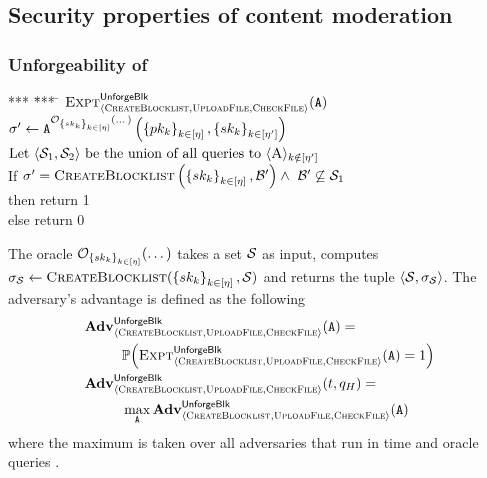 \iffalse 
\subsection{Security properties of content moderation}
\label{sec:defn:content_mod}
\subsubsection{Unforgeability of \blklistToken}
%

		\begin{center}
	\begin{minipage}{0.5\columnwidth}
		\begin{tabbing}
			*** \= *** \= \kill
			$\Experiment{\unforgeBlocklistLabel}{\contentModSchemeDefn}(\adversary)$ \\
			\> $\genericSigAlt \assign \adversary^{\genericOracle_{\setOfAuditorPrivkeys}(\dots)}\left(\setOfAuditorPubkeys, \setOfDishonestAuditorPrivkeys\right)$\\
			\> $\text{Let} ~\langle\genericSetVar[1], \genericSetVar[2]\rangle ~\text{be the union of all queries to} ~\langle \auditor \rangle_{\auditorIdx \notin \nats[\numDishonestAuditors]}$\\
	        \> If $\genericSigAlt =  \createBlocklist\left(\setOfAuditorPrivkeys, \blocklist' \right) 
			\land ~\blocklist' \not \subseteq \genericSetVar[1]$\\
			\> \> then return 1\\
            \> \> else return 0
		\end{tabbing}
	\end{minipage}
	\end{center}	


The oracle $\genericOracle_{\setOfAuditorPrivkeys}(\dots)$ takes a set $\genericSetVar$ as input, computes $\genericSig[\genericSetVar] \assign \createBlocklist(\setOfAuditorPrivkeys, \genericSetVar)$ and returns the tuple $\langle \genericSetVar, \genericSig[\genericSetVar] \rangle$. 
The adversary's advantage is defined as the following 
\begin{align*}
	& \Advantage{\unforgeBlocklistLabel}{\contentModSchemeDefn}(\adversary)= \\ 
	& ~~\qquad \prob{\Experiment{\unforgeBlocklistLabel}{\contentModSchemeDefn}(\adversary) = 
		1} \\
	& \Advantage{\unforgeBlocklistLabel}{\contentModSchemeDefn}(\timeBound, \oracleQueries) = \\
	& ~~\qquad \max_{\indcpaAdversary} \Advantage{\unforgeBlocklistLabel}{\contentModSchemeDefn}(\indcpaAdversary)
\end{align*}
where the maximum is taken over all adversaries \adversary that run in time \timeBound and oracle queries \numOracleQueries.





